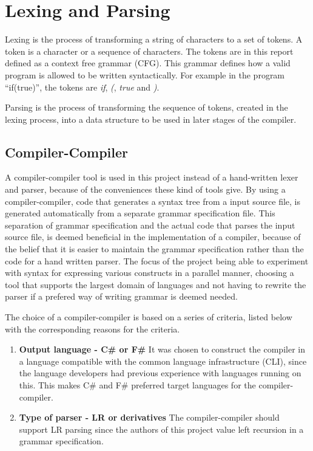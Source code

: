 \section{Lexing and Parsing}
\label{sec:lexing/parsing}

Lexing is the process of transforming a string of characters to a set of tokens. A token is a character or a sequence of characters. The tokens are in this report defined as a context free grammar (CFG). This grammar defines how a valid program is allowed to be written syntactically. For example in the program \enquote{if(true)}, the tokens are \emph{if}, \emph{(}, \emph{true} and \emph{)}.

Parsing is the process of transforming the sequence of tokens, created in the lexing process, into a data structure to be used in later stages of the compiler.

\subsection{Compiler-Compiler}
\label{sec:compiler_compiler_choice}

A compiler-compiler tool is used in this project instead of a hand-written lexer and parser, because of the conveniences these kind of tools give. By using a compiler-compiler, code that generates a syntax tree from a input source file, is generated automatically from a separate grammar specification file. This separation of grammar specification and the actual code that parses the input source file, is deemed beneficial in the implementation of a compiler, because of the belief that it is easier to maintain the grammar specification rather than the code for a hand written parser. The focus of the project being able to experiment with syntax for expressing various constructs in a parallel manner, choosing a tool that supports the largest domain of languages and not having to rewrite the parser if a prefered way of writing grammar is deemed needed.

The choice of a compiler-compiler is based on a series of criteria, listed below with the corresponding reasons for the criteria.

\begin{enumerate}
\item \textbf{Output language - C\# or F\#} It was chosen to construct the compiler in a language compatible with the common language infrastructure (CLI), since the language developers had previous experience with languages running on this. This makes C\# and F\# preferred target languages for the compiler-compiler.

\item \textbf{Type of parser - LR or derivatives} The compiler-compiler should support LR parsing since the authors of this project value left recursion in a grammar specification.\\

\end{enumerate}

